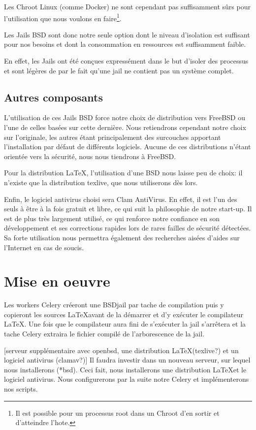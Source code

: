\documentclass[10pt,a4paper]{article}
\begin{document}
Les Chroot Linux (comme Docker) ne sont cependant pas suffisamment sûrs pour l'utilisation que nous voulons en faire\footnote{Il est possible pour un processus root dans un Chroot d'en sortir et d'atteindre l'hote.}.

Les Jails BSD sont donc notre seule option dont le niveau d'isolation est suffisant pour nos besoins et dont la consommation en ressources est suffisamment faible.

En effet, les Jails ont été conçues expressément dans le but d'isoler des processus et sont légères de par le fait qu'une jail ne contient pas un système complet.

\subsection{Autres composants}
L'utilisation de ces Jails BSD force notre choix de distribution vers FreeBSD ou l'une de celles basées sur cette dernière. Nous retiendrons cependant notre choix sur l'originale, les autres étant principalement des surcouches apportant l'installation par défaut de différents logiciels. Aucune de ces distributions n'étant orientée vers la sécurité, nous nous tiendrons à FreeBSD.

Pour la distribution \LaTeX, l'utilisation d'une BSD nous laisse peu de choix: il n'existe que la distribution texlive, que nous utiliserons dès lors.

Enfin, le logiciel antivirus choisi sera Clam AntiVirus.
En effet, il est l'un des seuls à être à la fois gratuit et libre, ce qui suit la philosophie de notre start-up.
Il est de plus très largement utilisé, ce qui renforce notre confiance en son développement et ses corrections rapides lors de rares failles de sécurité détectées.
Sa forte utilisation nous permettra également des recherches aisées d'aides sur l'Internet en cas de soucis.

\section{Mise en oeuvre}

Les workers Celery créeront une BSDjail par tache de compilation puis y copieront les sources \LaTeX avant de la démarrer et d'y exécuter le compilateur \LaTeX.
Une fois que le compilateur aura fini de s'exécuter la jail s'arrêtera et la tache Celery extraira le fichier compilé de l'arborescence de la jail.

[serveur supplémentaire avec openbsd, une distribution \LaTeX (texlive?) et un logiciel antivirus (clamav?)]
Il faudra investir dans un nouveau serveur, sur lequel nous installerons (*bsd).
Ceci fait, nous installerons une distribution \LaTeX et le logiciel antivirus.
Nous configurerons par la suite notre Celery et implémenterons nos scripts.
\end{document}
